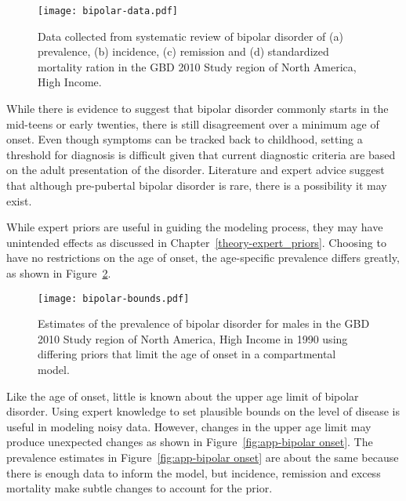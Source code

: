     \begin{figure}[h]
        \begin{center}
            \texttt{[image: bipolar-data.pdf]}
            \caption{Data collected from systematic review of bipolar
              disorder of (a) prevalence, (b) incidence, (c) remission and
              (d) standardized mortality ration in the GBD 2010 Study 
              region of North America, High Income.}
            \label{fig:app-bipolar data}
        \end{center}
    \end{figure}

While there is evidence to suggest that bipolar disorder commonly
starts in the mid-teens or early twenties, there is still disagreement
over a minimum age of onset.  Even though symptoms can be tracked back
to childhood, setting a threshold for diagnosis is difficult given
that current diagnostic criteria are based on the adult presentation of
the disorder.  Literature and expert advice suggest that although
pre-pubertal bipolar disorder is rare, there is a possibility it may
exist. \cite{kloos_bipolar_2011, angst_historical_2000}

While expert priors are useful in guiding the modeling process, they
may have unintended effects as discussed in Chapter~\ref{theory-expert_priors}.
Choosing to have no restrictions on the
age of onset, the age-specific prevalence differs greatly, as shown in
Figure~\ref{fig:app-bipolar bounds}.

    \begin{figure}[h]
        \begin{center}
            \texttt{[image: bipolar-bounds.pdf]}
            \caption{Estimates of the prevalence of bipolar disorder
              for males in the GBD 2010 Study region of North America, High Income
              in 1990 using differing priors that limit the age of onset
              in a compartmental model.}
            \label{fig:app-bipolar bounds}
        \end{center}
    \end{figure}

Like the age of onset, little is known about the upper age limit of
bipolar disorder.  Using expert knowledge to set plausible bounds on the
level of disease is useful in modeling noisy data.  However, changes in the upper age
limit may produce unexpected changes as shown in Figure~\ref{fig:app-bipolar onset}.
The prevalence estimates in Figure~\ref{fig:app-bipolar onset} are about
the same because there is enough data to inform the model, but incidence,
remission and excess mortality make subtle changes to account for the prior.

